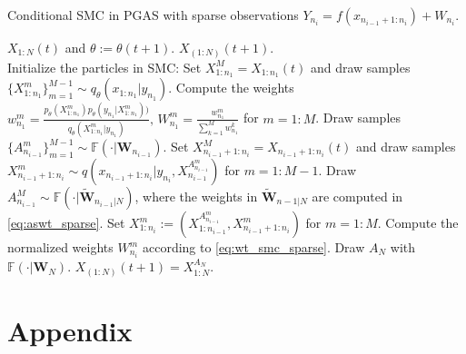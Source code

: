\documentclass[12pt]{article}
\begin{document}
\begin{algorithm} %
\caption{Conditional SMC in PGAS with sparse observations $Y_{n_i} = f(x_{n_{i-1}+1:n_i} )+ W_{n_i}$.} 
\label{alg:pgas_sparse} %
\begin{algorithmic} [1]  %
    \REQUIRE  $X_{1:N}(t)$ and  $\theta:=\theta(t+1)$. 
     \ENSURE $X_{(1:N)}(t+1)$.  \\
     Initialize the particles in SMC: 
     \STATE \hspace{3mm}  Set $X_{1:n_1}^M= X_{1:n_1}(t)$ and draw samples $\{X_{1:n_1}^m\}_{m=1}^{M-1} \sim q_\theta(x_{1:n_1}| y_{n_1})$.
     \STATE \hspace{3mm}   Compute the weights %
     $w_{n_1}^m =\frac{p_\theta(X_{1:n_1}^m)p_\theta(y_{n_1}|X_{1:n_1}^m))}{q_\theta(X_{1:n_1}^m |y_{n_1})},\, W_{n_1}^m= \frac{w_{n_1}^m}{\sum_{k=1}^Mw_{n_1}^k}$ for $m=1:M$.
            \STATE  Draw samples $\{A_{n_{i-1}}^m\}_{m=1}^{M-1}\sim \mathbb{F}(\cdot | \mathbf{W}_{n_{i-1}})$. 
            \STATE  Set $X_{n_{i-1}+1:n_i}^M= X_{n_{i-1}+1:n_i}(t)$ and draw samples $X_{n_{i-1}+1:n_i}^m\sim q(x_{n_{i-1}+1:n_i}|y_{n_i}, X_{n_{i-1}}^{A_{n_{i-1}}^m} )$ for $m=1:M-1$.
            \STATE Draw $A_{n_{i-1}}^M \sim  \mathbb{F}(\cdot | \widetilde{\mathbf{W}}_{n_{i-1}|N})$, where the weights in $ \widetilde{\mathbf{W}}_{n-1|N}$ are computed in \eqref{eq:aswt_sparse}. 
            \STATE Set $X_{1:n_i}^{m} := (X_{1:n_{i-1}}^{A_{n_{i-1}}^m}, X_{n_{i-1}+1:n_i}^m)$ for $m=1:M$. 
            \STATE Compute the normalized weights $W_{n_i}^m$ according to \eqref{eq:wt_smc_sparse}. 
    \ENDFOR     
    \STATE Draw $A_N$ with  $\mathbb{F}(\cdot | \mathbf{W}_{N})$.
    \RETURN $X_{(1:N)}(t+1) = X_{1:N}^{A_N}$. 
     \end{algorithmic}
\end{algorithm}



 
\newpage
\section{Appendix}
\end{document}

